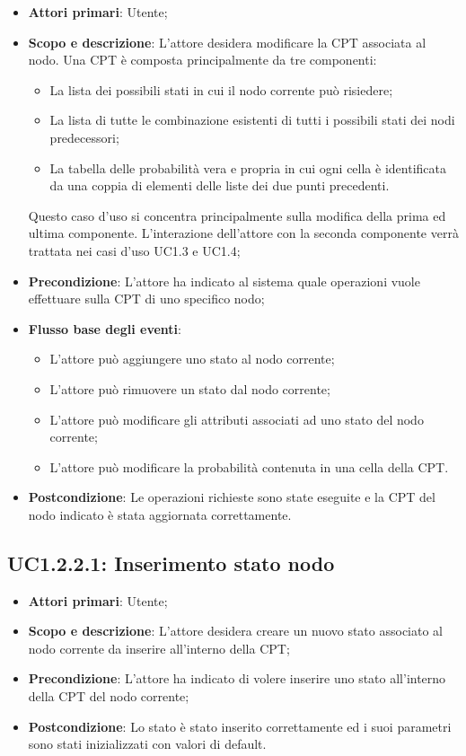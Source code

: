 \begin{itemize} 
	\item{\textbf{Attori primari}: Utente;} 
	\item{\textbf{Scopo e descrizione}: L'attore desidera modificare la CPT associata al nodo. Una CPT è composta principalmente da tre componenti: 
		\begin{itemize} 
			\item{La lista dei possibili stati in cui il nodo corrente può risiedere;} 
			\item{La lista di tutte le combinazione esistenti di tutti i possibili stati dei nodi predecessori;} 
			\item{La tabella delle probabilità vera e propria in cui ogni cella è identificata da una coppia di elementi delle liste dei due punti precedenti.} 
		\end{itemize} 
		Questo caso d'uso si concentra principalmente sulla modifica della prima ed ultima componente. L'interazione dell'attore con la seconda componente verrà trattata nei casi d'uso UC1.3 e UC1.4;
	} 
	\item{\textbf{Precondizione}: L'attore ha indicato al sistema quale operazioni vuole effettuare sulla CPT di uno specifico nodo;} 
	\item{\textbf{Flusso base degli eventi}: } 
	\begin{itemize} 
		\item{L'attore può aggiungere uno stato al nodo corrente;} 
		\item{L'attore può rimuovere un stato dal nodo corrente;} 
		\item{L'attore può modificare gli attributi associati ad uno stato del nodo corrente;} 
		\item{L'attore può modificare la probabilità contenuta in una cella della CPT.} 
	\end{itemize} 
	\item{\textbf{Postcondizione}: Le operazioni richieste sono state eseguite e la CPT del nodo indicato è stata aggiornata correttamente.} 
\end{itemize} 
\subsection{UC1.2.2.1: Inserimento stato nodo} 
\begin{itemize} 
	\item{\textbf{Attori primari}: Utente;} 
	\item{\textbf{Scopo e descrizione}: L'attore desidera creare un nuovo stato associato al nodo corrente da inserire all'interno della CPT;} 
	\item{\textbf{Precondizione}: L'attore ha indicato di volere inserire uno stato all'interno della CPT del nodo corrente;} 
	\item{\textbf{Postcondizione}: Lo stato è stato inserito correttamente ed i suoi parametri sono stati inizializzati con valori di default.} 
\end{itemize} 
